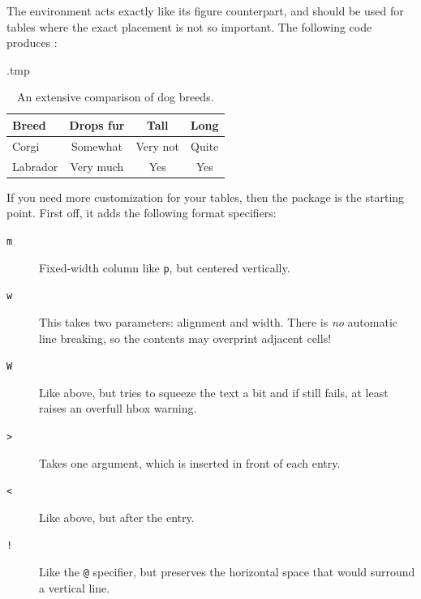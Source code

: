 The  environment acts exactly like its figure counterpart,
and should be used for tables where the exact placement is not so important.
The following code produces :
%
\begin{VerbatimOut}{\jobname.tmp}
\begin{table}[ht]
\centering
\begin{tabular}{l|ccc}
  Breed & Drops fur & Tall & Long\\
  \hline
  Corgi & Somewhat & Very not & Quite\\
  Labrador & Very much & Yes & Yes
\end{tabular}
\caption{An extensive comparison of dog breeds.}
\label{tbl:dogs}
\end{table}
\end{VerbatimOut}
\ExecuteExample


If you need more customization for your tables, then the  package is the starting point.
First off, it adds the following format specifiers:
\begin{description}
\item[\texttt{m}] Fixed-width column like \verb|p|, but centered vertically.
\item[\texttt{w}] This takes two parameters: alignment and width.
    There is \emph{no} automatic line breaking,
    so the contents may overprint adjacent cells!
\item[\texttt{W}] Like above, but tries to squeeze the text a bit and if still fails,
    at least raises an overfull hbox warning.
\item[\texttt{>}] Takes one argument, which is inserted in front of each entry.
\item[\texttt{<}] Like above, but after the entry.
\item[\texttt{!}] Like the \verb|@| specifier,
    but preserves the horizontal space that would surround a vertical line.
\end{description}

